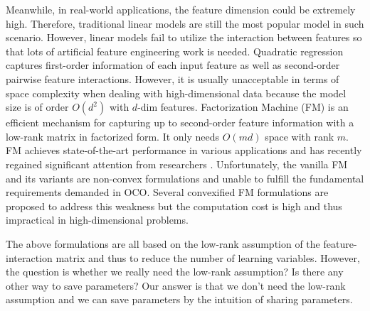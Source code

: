 \documentclass[letterpaper]{article} %
\theoremstyle{plain}
\theoremstyle{definition}
\begin{document}
Meanwhile, in real-world applications, the feature dimension could be extremely high. Therefore, traditional linear models are still the most popular model in such scenario. However, linear models fail to utilize the interaction between features so that lots of artificial feature engineering work is needed. Quadratic regression captures first-order information of each input feature as well as second-order pairwise feature interactions. However, it is usually unacceptable in terms of space complexity when dealing with high-dimensional data because the model size is of order $O(d^2)$ with $d$-dim features. Factorization Machine (FM) \cite{RendleICDM} is an efficient mechanism for capturing up to second-order feature information with a low-rank matrix in factorized form. It only needs $O(md)$ space with rank $m$. FM achieves state-of-the-art performance in various applications \cite{JuanWWW,LiDifacto,LuWSDM,NguyenSIGIR,RendleSIGIR,ZhongCIKM,ChenFMVAE,ChenRaFM} and has recently regained significant attention from researchers \cite{BlondelNIPS,BlondelICML,HeIJCAI,XuICDM}. Unfortunately, the vanilla FM \cite{RendleICDM} and its variants \cite{BlondelNIPS,ChengACM,JuanWWW,LuWSDM} are non-convex formulations and unable to fulfill the fundamental requirements demanded in OCO. Several convexified FM formulations \cite{BlondelECML,LinWWW,YamadaKDD} are proposed to address this weakness but the computation cost is high and thus impractical in high-dimensional problems.

The above formulations are all based on the low-rank assumption of the feature-interaction matrix and thus to reduce the number of learning variables. However, the question is whether we really need the low-rank assumption? Is there any other way to save parameters? Our answer is that we don't need the low-rank assumption and we can save parameters by the intuition of sharing parameters.
\end{document}
